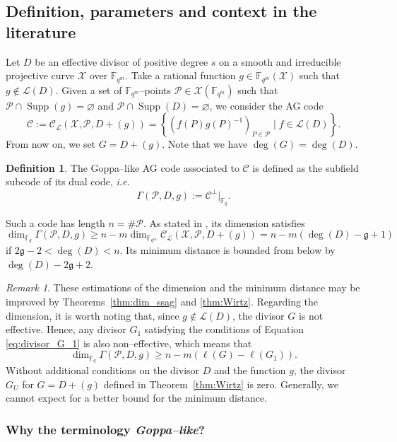 \documentclass[a4paper]{amsart}
\theoremstyle{definition}
\newtheorem{definition}[thm]{Definition}
\theoremstyle{remark}
\newtheorem{remark}[thm]{Remark}
\newcommand{\calP}{\mathcal{P}}
\newcommand{\calL}{\mathcal{L}}
\newcommand{\calC}{\mathcal{C}}
\newcommand{\calX}{\mathcal{X}}
\newcommand{\fqm}{\mathbb{F}_{q^m}}
\newcommand{\fq}{\mathbb{F}_{q}}
\newcommand{\set}[1]{\left\{#1\right\}}
\newcommand{\Supp}{\operatorname{Supp}}
\begin{document}
\subsection{Definition, parameters and context in the literature}\label{subsec:def-Goppa}

Let $D$ be an effective divisor of positive degree $s$ on a smooth and irreducible projective curve $\calX$ over $\fqm$. Take a rational function $g \in \fqm(\calX)$ such that $g \notin \calL(D)$. Given a set of $\fqm$--points $\calP \in \calX(\fqm)$ such that $\calP \cap \Supp(g) = \varnothing$ and $\calP \cap \Supp(D) = \varnothing$, we consider the AG code
\[\calC := \calC_{\calL}(\calX,\calP,D+(g))=\set{\left(f(P)g(P)^{-1}\right)_{P \in \calP} \mid f \in \calL(D)}.\]
From now on, we set $G=D+(g)$. Note that we have $\deg(G)=\deg(D)$.
\begin{definition} \label{def:Goppa--like_AG_code}
The Goppa--like AG code associated to $\calC$ is defined as the subfield subcode of its dual code, \emph{i.e.}
\[ \Gamma(\calP,D,g) := \calC^{\perp}|_{\fq}.\]
\end{definition}%
%
Such a code has length $n = \# \calP$. As stated in \cite[Theorem~1]{JM96}, its dimension satisfies 
\[\dim_{\fq} \Gamma(\calP,D,g) \geq n-m \dim_{\fqm} \calC_{\calL}(\calX,\calP,D+(g)) =n-m(\deg (D) - \mathfrak{g} +1 )\]
if $2\mathfrak{g} - 2 < \deg (D) < n$. Its minimum distance is bounded from below by $\deg (D) - 2 \mathfrak{g} + 2$.

\begin{remark}
These estimations of the dimension and the minimum distance may be improved by Theorems~\ref{thm:dim_ssag} and \ref{thm:Wirtz}. Regarding the dimension, it is worth noting that, since $g \notin \calL(D)$, the divisor $G$ is not effective. Hence, any divisor $G_1$ satisfying the conditions of Equation \eqref{eq:divisor_G_1} is also non--effective, which means that
\[	\dim_{\fq}  \Gamma(\calP,D,g) \geq 	n-m\left(\ell(G) - \ell(G_1)\right). \]
Without additional conditions on the divisor $D$ and the function $g$, the divisor $G_U$ for $G=D+(g)$ defined in Theorem~\ref{thm:Wirtz} is zero. Generally, we cannot expect for a better bound for the minimum distance. 
\end{remark}



\subsubsection{Why the terminology \textit{Goppa--like}?}
\end{document}
